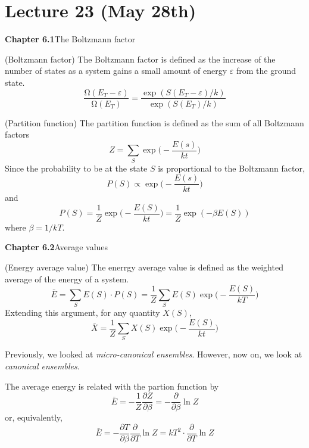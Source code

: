 \section{Lecture 23 (May 28th)}
{\bf Chapter 6.1}\hspace{2ex}The Boltzmann factor
\newline
\begin{defi}
(Boltzmann factor) The Boltzmann factor is defined as the increase of the number of states as a system gains a small amount of energy $\varepsilon $ from the ground state.
\[\dfrac{\mathrm{\Omega} (E_{T}-\varepsilon )}{\mathrm{\Omega} (E_{T})}=\dfrac{\exp ({S(E_{T}-\varepsilon )/k})}{\exp ({S(E_{T})/k})}\]
\end{defi}
\vspace{2ex}
\begin{defi}
(Partition function) The partition function is defined as the sum of all Boltzmann factors
\[Z=\sum _{S}\exp \Big(-\dfrac{E(s)}{kt}\Big)\]
Since the probability to be at the state $S$ is proportional to the Boltzmann factor,
\[P(S)\propto \exp \Big(-\dfrac{E(s)}{kt}\Big)\]
and
\[P(S)=\dfrac{1}{Z}\exp\Big(-\dfrac{E(S)}{kt}\Big)=\dfrac{1}{Z}\exp (-\beta E(S))\]
where $\beta =1/kT$.
\end{defi}
\vspace{2ex}
{\bf Chapter 6.2}\hspace{2ex}Average values
\newline
\begin{defi}
(Energy average value) The enerrgy average value is defined as the weighted average of the energy of a system.
\[\bar{E}=\sum _{S}E(S)\cdot P(S)=\dfrac{1}{Z}\sum _{S}E(S)\exp \Big(-\dfrac{E(S)}{kT}\Big)\]
Extending this argument, for any quantity $X(S)$,
\[\bar{X}=\dfrac{1}{Z}\sum _{S}X(S)\exp \Big(-\dfrac{E(S)}{kt}\Big)\]
\end{defi}
\vspace{2ex}
\begin{defi}
Previously, we looked at {\it micro-canonical ensembles}. However, now on, we look at {\it canonical ensembles}.
\end{defi}
\vspace{2ex}
\begin{thm}
The average energy is related with the partion function by
\[\bar{E}=-\dfrac{1}{Z}\dfrac{\partial Z}{\partial \beta }=-\dfrac{\partial }{\partial \beta }\ln Z  \]
or, equivalently,
\[\bar{E}=-\dfrac{\partial T}{\partial \beta }\dfrac{\partial }{\partial T}\ln Z=kT^2\cdot \dfrac{\partial }{\partial T}\ln Z   \]
\end{thm}
